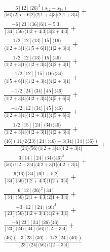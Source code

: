 \documentclass[varwidth, border=5pt]{standalone}
\begin{document}
\begin{my}
$\begin{gathered}
\scriptscriptstyle\frac{6[12]⟨26⟩^2(s_{12}-s_{34})}{⟨56⟩⟨2|5+6|2]⟨2|1+4|3]⟨2|1+3|4]}+\\
\scriptscriptstyle\frac{-6[23]⟨36⟩⟨6|1+5|3]}{[34]⟨56⟩⟨1|2+4|3]⟨3|2+4|3]}+\\
\scriptscriptstyle\frac{1/2[12]⟨13⟩[15]⟨16⟩}{⟨1|2+3|1]⟨1|5+6|1]⟨1|2+3|4]}+\\
\scriptscriptstyle\frac{1/2[12]⟨13⟩[15]⟨46⟩}{⟨1|2+3|1]⟨1|2+3|4]⟨4|2+3|1]}+\\
\scriptscriptstyle\frac{-1/2[12][15]⟨16⟩⟨34⟩}{⟨1|5+6|1]⟨1|2+3|4]⟨4|2+3|1]}+\\
\scriptscriptstyle\frac{-1/2[24]⟨34⟩[45]⟨46⟩}{⟨1|2+3|4]⟨4|2+3|4]⟨4|5+6|4]}+\\
\scriptscriptstyle\frac{-1/2[12]⟨34⟩[45]⟨46⟩}{⟨1|2+3|4]⟨4|2+3|1]⟨4|5+6|4]}+\\
\scriptscriptstyle\frac{1/2[15][24]⟨34⟩⟨46⟩}{⟨1|2+3|4]⟨4|2+3|1]⟨4|2+3|4]}+\\
\scriptscriptstyle\frac{⟨46⟩(11/2⟨23⟩[24]⟨46⟩-3⟨34⟩[34]⟨36⟩)}{⟨24⟩⟨56⟩⟨1|2+3|4]⟨4|2+3|4]}+\\
\scriptscriptstyle\frac{3[14][24]⟨34⟩⟨46⟩^2}{⟨56⟩⟨1|2+3|4]⟨4|2+3|1]⟨4|2+3|4]}+\\
\scriptscriptstyle\frac{6⟨16⟩[34]⟨6|1+5|2]}{[34]⟨56⟩⟨1|2+4|3]⟨1|2+3|4]}+\\
\scriptscriptstyle\frac{6[12]⟨26⟩^2[34]}{[34]⟨56⟩⟨2|1+4|3]⟨2|1+3|4]}+\\
\scriptscriptstyle\frac{-3[12][24]⟨46⟩^2}{[23]⟨56⟩⟨1|2+3|4]⟨4|2+3|1]}+\\
\scriptscriptstyle\frac{-6[23][24]⟨26⟩⟨46⟩}{[23]⟨24⟩[34]⟨56⟩⟨1|2+3|4]}+\\
\scriptscriptstyle\frac{⟨46⟩(-3[23]⟨36⟩+1/2[24]⟨46⟩)}{[23]⟨24⟩⟨56⟩⟨1|2+3|4]}\phantom{+}
\end{gathered}$
\end{my}
\end{document}
